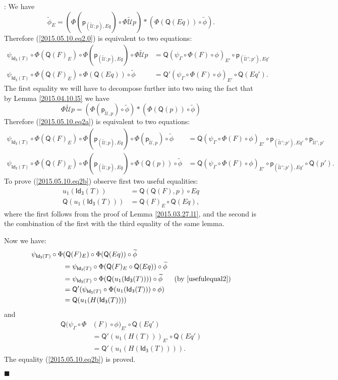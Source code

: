 \documentclass[12pt]{article}
\numberwithin{equation}{section}
\newenvironment{myproof}{{\bf Proof}:}{$\blacksquare$ \vskip 5mm }
\newcommand{\by}[1]{\text{(by #1)}}
\newcommand{\wt}{\widetilde}
\newcommand{\p}{\mathsf{p}}
\newcommand{\Idx}{\mathsf{Id_3}} %
\newcommand{\U}{\mathcal{U}}
\newcommand{\Q}{\mathsf{Q}}
\begin{document}
\begin{myproof}
We have
%
$$\wt{\phi}_E=(\Phi(\p_{(\wt{\U};p),Eq})\circ
\Phi\wt{\U}p)*(\Phi(\Q(Eq))\circ\wt{\phi}).$$
%
Therefore (\ref{2015.05.10.eq2.0}) is equivalent to two equations:
%
\begin{align}
  \psi_{\Idx(T)}\circ \Phi(\Q(F)_E)\circ \Phi(\p_{(\wt{\U};p),Eq})\circ \Phi\wt{\U}p
  & = \Q(\psi_{\Gamma}\circ \Phi(F)\circ \phi)_{E'}\circ \p_{(\wt{\U}';p'),Eq'} \label{2015.05.10.eq2a} \\
  \psi_{\Idx(T)}\circ \Phi(\Q(F)_E)\circ \Phi(\Q(Eq))\circ\wt{\phi}
  & = \Q'(\psi_{\Gamma}\circ \Phi(F)\circ \phi)_{E'}\circ \Q(Eq'). \label{2015.05.10.eq2b}
\end{align}
%
The first equality we will have to decompose further into two using the fact
that by Lemma \ref{2015.04.10.l5} we have
%
$$\Phi\wt{\U}p=(\Phi(\p_{\wt{\U},p})\circ\wt{\phi})*(\Phi(\Q(p))\circ \wt{\phi})$$
%
Therefore (\ref{2015.05.10.eq2a}) is equivalent to two equations:
%
\begin{align}
  \psi_{\Idx(T)}\circ \Phi(\Q(F)_E)\circ \Phi(\p_{(\wt{\U};p),Eq})\circ \Phi(\p_{\wt{\U},p})\circ\wt{\phi}
  & = \Q(\psi_{\Gamma}\circ \Phi(F)\circ \phi)_{E'}\circ \p_{(\wt{\U}';p'),Eq'}\circ \p_{\wt{\U}',p'} \label{2015.05.10.eq2aa} \\
  \psi_{\Idx(T)}\circ \Phi(\Q(F)_E)\circ \Phi(\p_{(\wt{\U};p),Eq})\circ \Phi(\Q(p))\circ\wt{\phi}
  & = \Q(\psi_{\Gamma}\circ \Phi(F)\circ \phi)_{E'}\circ \p_{(\wt{\U}';p'),Eq'}\circ \Q(p'). \label{2015.05.10.eq2ab}
\end{align}
%
To prove (\ref{2015.05.10.eq2b}) observe first two useful equalities:
%
\begin{align}
  u_1(\Idx(T))&=\Q(\Q(F),p)\circ Eq \label{usefulequal1} \\
  \Q(u_1(\Idx(T)))&=\Q(F)_{E}\circ \Q(Eq), \label{usefulequal2}
\end{align}
%
where the first follows from the proof of Lemma \ref{2015.03.27.l1}, and the
second is the combination of the first with the third equality of the same
lemma.

Now we have:
%
\begin{align*}
        \psi_{\Idx(T)}\circ \Phi&(\Q(F)_E) \circ \Phi(\Q(Eq))\circ\wt{\phi} \\
    & = \psi_{\Idx(T)}\circ \Phi (\Q(F)_E  \circ \Q(Eq))     \circ\wt{\phi} \\
    & = \psi_{\Idx(T)}\circ \Phi (\Q(u_1(\Idx(T))))          \circ\wt{\phi} & \by{\ref{usefulequal2}} \\
    & = \Q'(\psi_{\Idx(T)}\circ \Phi(u_1(\Idx(T)))\circ \phi) \\
    & = \Q(u_1(H(\Idx(T))))
\end{align*}
%
and
%
\begin{align*}
  \Q(\psi_{\Gamma}\circ \Phi&(F)\circ \phi)_{E'}\circ \Q(Eq') \\
  & =\Q'(u_1(H(T)))_{E'}\circ \Q(Eq') \\
  & =\Q'(u_1(H(\Idx(T)))).
\end{align*}
%
The equality (\ref{2015.05.10.eq2b}) is proved.


\end{myproof}
\end{document}
